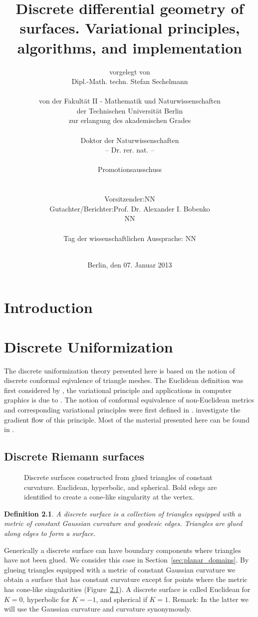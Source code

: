\documentclass{book}
\title{Discrete differential geometry of surfaces. Variational principles, algorithms, and implementation}
\author{
vorgelegt von\\
Dipl.-Math. techn. Stefan Sechelmann\\
\vspace{0.3cm}\\
von der Fakult{\"a}t II - Mathematik und Naturwissenschaften\\
der Technischen Universit{\"a}t Berlin\\
zur erlangung des akademischen Grades\\
\vspace{0.3cm}\\
Doktor der Naturwissenschaften\\
-- Dr. rer. nat. --\\
\vspace{2cm}\\
Promotionsausschuss\\
\vspace{0.3cm}\\
\begin{tabular}{rl}
Vorsitzender: & NN \\
Gutachter/Berichter: & Prof. Dr. Alexander I. Bobenko \\
& NN 
\end{tabular}
\vspace{0.3cm}\\
Tag der wissenschaftlichen Aussprache: NN\\
\vspace{2cm}\\
}
\date{Berlin, den 07. Januar 2013}
\newtheorem{definition}{Definition}
\begin{document}
\frontmatter
\maketitle
\newpage

\tableofcontents
\newpage
\listoffigures

\newpage
\mainmatter
\chapter{Introduction}


\chapter{Discrete Uniformization}

The discrete uniformization theory persented here is based on the notion of discrete conformal eqivalence of triangle meshes. The Euclidean definition was first considered by \cite{Luo2004}, the variational principle and applications in computer graphics is due to \cite{Springborn2008, OWF2009, Bobenko2010}. The notion of conformal equivalence of non-Euclidean metrics and corresponding variational principles were first defined in \cite{Bobenko2010}. \cite{Guo2011} investigate the gradient flow of this principle.
Most of the material presented here can be found in \cite{BobSechSpr}.

\section{Discrete Riemann surfaces}

\begin{figure}
\centering
\scalebox{0.8}{}
\caption{Discrete surfaces constructed from glued triangles of constant curvature. Euclidean, hyperbolic, and spherical. Bold edegs are identified to create a cone-like singularity at the vertex.}
\label{fig:surface_triangles}
\end{figure}

\begin{definition}
A \emph{discrete surface} is a collection of triangles equipped with a metric of constant Gaussian curvature and geodesic edges. Triangles are glued along edges to form a surface.
\end{definition}

Generically a discrete surface can have boundary components where triangles have not been glued. We consider this case in Section~\ref{sec:planar_domains}. By glueing triangles equipped with a metric of constant Gaussian curvature we obtain a surface that has constant curvature except for points where the metric has cone-like singularities (Figure~\ref{fig:surface_triangles}). A discrete surface is called Euclidean for $K=0$, hyperbolic for $K=-1$, and spherical if $K=1$.
Remark: In the latter we will use the Gaussian curvature and curvature synonymously.
\end{document}

